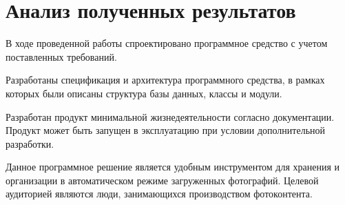\section{Анализ полученных результатов}

В ходе проведенной работы спроектировано программное средство с учетом поставленных требований. 

Разработаны спецификация и архитектура программного средства, в рамках которых были описаны структура базы данных, классы и модули.

Разработан продукт минимальной жизнедеятельности согласно документации.
Продукт может быть запущен в эксплуатацию при условии дополнительной разработки.

Данное программное решение является удобным инструментом для хранения и организации в автоматическом режиме загруженных фотографий. 
Целевой аудиторией являются люди, занимающихся производством фотоконтента.

\clearpage
